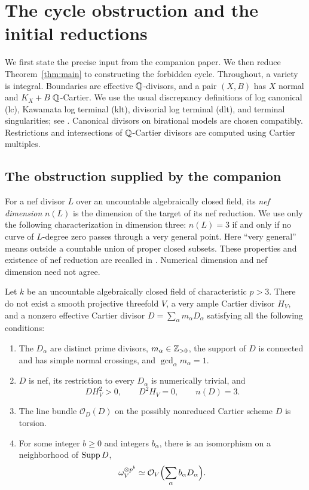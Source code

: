 \section{The cycle obstruction and the initial reductions}
\label{sec:foundations}

We first state the precise input from the companion paper. We then reduce
Theorem~\ref{thm:main} to constructing the forbidden cycle. Throughout, a
variety is integral. Boundaries are effective $\mathbb Q$-divisors, and a pair
$(X,B)$ has $X$ normal and $K_X+B$ $\mathbb Q$-Cartier. We use the usual discrepancy
definitions of log canonical (lc), Kawamata log terminal (klt), divisorial
log terminal (dlt), and terminal singularities; see \cite{KM}. Canonical
divisors on birational models are chosen compatibly. Restrictions and
intersections of $\mathbb Q$-Cartier divisors are computed using Cartier multiples.

\subsection{The obstruction supplied by the companion}

For a nef divisor $L$ over an uncountable algebraically closed field, its
\emph{nef dimension} $n(L)$ is the dimension of the target of its nef
reduction. We use only the following characterization in dimension three:
$n(L)=3$ if and only if no curve of $L$-degree zero passes through a very
general point. Here ``very general'' means outside a countable union of
proper closed subsets. These properties and existence of nef reduction are
recalled in \cite[Definition~2.1 and Theorem~2.2]{XuNuTwo}. Numerical
dimension and nef dimension need not agree.

\begin{theorem}
\label{thm:obstruction}
Let $k$ be an uncountable algebraically closed field of characteristic
$p>3$. There do not exist a smooth projective threefold $V$, a very ample
Cartier divisor $H_V$, and a nonzero effective Cartier divisor
$D=\sum_\alpha m_\alpha D_\alpha$ satisfying all the following conditions:
\begin{enumerate}[label=\textup{(\roman*)}]
\item The $D_\alpha$ are distinct prime divisors, $m_\alpha\in\mathbb Z_{>0}$,
the support of $D$ is
connected and has simple normal crossings, and $\gcd_\alpha m_\alpha=1$.
\item $D$ is nef, its restriction to every $D_\alpha$ is numerically
trivial, and
\[
DH_V^2>0,\qquad D^2H_V=0,\qquad n(D)=3.
\]
\item The line bundle $\mathcal O_D(D)$ on the possibly nonreduced
Cartier scheme $D$ is torsion.
\item For some integer $b\geq0$ and integers $b_\alpha$, there is an
isomorphism on a neighborhood of $\operatorname{Supp} D$,
\begin{equation}\label{eq:canonical-cycle}
\omega_V^{\otimes p^b}\simeq
\mathcal O_V\Bigl(\sum_\alpha b_\alpha D_\alpha\Bigr).
\end{equation}
\end{enumerate}
\end{theorem}


